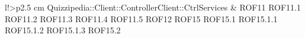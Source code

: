 \begin{tabella}{l!{\VRule}>{\centering\arraybackslash}p{2.5 cm}}
Quizzipedia::Client::ControllerClient::CtrlServices & ROF11 \linebreak ROF11.1 \linebreak ROF11.2 \linebreak ROF11.3 \linebreak ROF11.4 \linebreak ROF11.5 \linebreak ROF12 \linebreak ROF15 \linebreak ROF15.1 \linebreak ROF15.1.1 \linebreak ROF15.1.2 \linebreak ROF15.1.3 \linebreak ROF15.2 \
\end{tabella}
